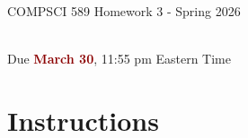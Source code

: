 \documentclass{article}
\begin{document}
\newpage
\vspace*{1cm}
\begin{center}
    \begin{Large}
    COMPSCI 589 Homework 3 - Spring 2026
    \end{Large}
    \\
    \vspace{0.15cm}
    Due \textcolor{darkred}{\textbf{March 30}}, 11:55 pm Eastern Time
\end{center}





\vspace{0.5cm}
\section*{Instructions}
\vspace{0.5cm}
\end{document}
